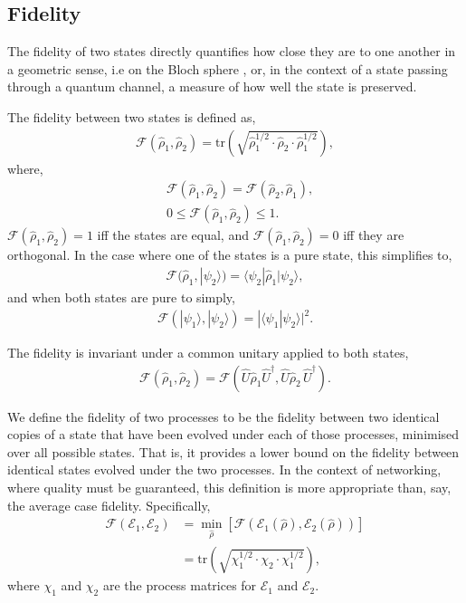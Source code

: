 \documentclass[aps,rmp,twocolumn,amsmath,amssymb,nofootinbib,superscriptaddress,longbibliography,floatfix]{revtex4-1}
\newcommand{\bra}[1]{\langle#1|}
\newcommand{\ket}[1]{|#1\rangle}
\newcommand{\comment}[1]{{\color{blue}{\textbf{#1}}}}
\begin{document}
%
%

\subsection{Fidelity} \label{sec:fid_metric}

The fidelity of two states directly quantifies how close they are to one another in a geometric sense, i.e on the Bloch sphere \cite{???}, or, in the context of a state passing through a quantum channel, a measure of how well the state is preserved.

The fidelity between two states is defined as,
\begin{align}
\mathcal{F}(\hat\rho_1,\hat\rho_2) = \mathrm{tr}\left(\sqrt{\hat\rho_1^{1/2}\cdot\hat\rho_2\cdot\hat\rho_1^{1/2}}\right),
\end{align}
where,
\begin{align}
& \mathcal{F}(\hat\rho_1,\hat\rho_2) = \mathcal{F}(\hat\rho_2,\hat\rho_1), \nonumber \\
& 0\leq \mathcal{F}(\hat\rho_1,\hat\rho_2) \leq 1.
\end{align}
\mbox{$\mathcal{F}(\hat\rho_1,\hat\rho_2)=1$} iff the states are equal, and \mbox{$\mathcal{F}(\hat\rho_1,\hat\rho_2)=0$} iff they are orthogonal.
In the case where one of the states is a pure state, this simplifies to,
\begin{align}
\mathcal{F}(\hat\rho_1,\ket{\psi_2}) = \bra{\psi_2}\hat\rho_1\ket{\psi_2},
\end{align}
and when both states are pure to simply,
\begin{align}
\mathcal{F}(\ket{\psi_1},\ket{\psi_2}) = |\langle\psi_1 | \psi_2\rangle|^2.
\end{align}

The fidelity is invariant under a common unitary applied to both states,
\begin{align}
\mathcal{F}(\hat\rho_1,\hat\rho_2) = \mathcal{F}(\hat{U}\hat\rho_1 \hat{U}^\dag,\hat{U} \hat\rho_2\,\hat{U}^\dag).
\end{align}

We define the fidelity of two processes to be the fidelity between two identical copies of a state that have been evolved under each of those processes, minimised over all possible states. That is, it provides a lower bound on the fidelity between identical states evolved under the two processes. In the context of networking, where quality must be guaranteed, this definition is more appropriate than, say, the average case fidelity. Specifically,
\begin{align}
\mathcal{F}(\mathcal{E}_1,\mathcal{E}_2) &= \min_{\hat\rho} \left[\mathcal{F}(\mathcal{E}_1(\hat\rho),\mathcal{E}_2(\hat\rho))\right] \nonumber \\
&= \mathrm{tr}\left(\sqrt{\chi_1^{1/2}\cdot\chi_2\cdot\chi_1^{1/2}}\right),
\end{align}
\comment{CHECK THIS!} where $\chi_1$ and $\chi_2$ are the process matrices for $\mathcal{E}_1$ and $\mathcal{E}_2$.
\end{document}
